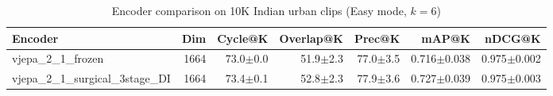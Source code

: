 \begin{table}[ht]
\centering
\caption{Encoder comparison on 10K Indian urban clips (Easy mode, $k=6$)}
\label{tab:encoder_comparison}
\begin{tabular}{lrrrrrr}
\toprule
Encoder & Dim & Cycle@K & Overlap@K & Prec@K & mAP@K & nDCG@K \\
\midrule
vjepa\_2\_1\_frozen & 1664 & 73.0{\tiny$\pm$0.0} & 51.9{\tiny$\pm$2.3} & 77.0{\tiny$\pm$3.5} & 0.716{\tiny$\pm$0.038} & 0.975{\tiny$\pm$0.002} \\
vjepa\_2\_1\_surgical\_3stage\_DI & 1664 & 73.4{\tiny$\pm$0.1} & 52.8{\tiny$\pm$2.3} & 77.9{\tiny$\pm$3.6} & 0.727{\tiny$\pm$0.039} & 0.975{\tiny$\pm$0.003} \\
\bottomrule
\end{tabular}
\end{table}